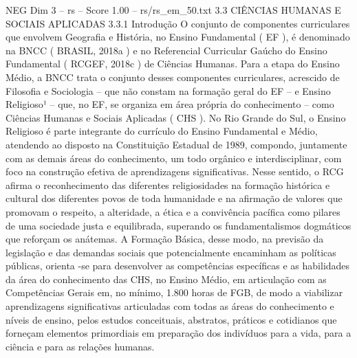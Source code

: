 \begin{textsample}{NEG Dim 3 – rs – Score 1.00 – rs/rs\_em\_50.txt}  \label{ex:f3_neg_049}
3.3 CIÊNCIAS HUMANAS E SOCIAIS APLICADAS 3.3.1 Introdução O conjunto de componentes curriculares que envolvem Geografia e História, no Ensino Fundamental ( EF ), é denominado na BNCC ( BRASIL, 2018a ) e no Referencial Curricular Gaúcho do Ensino Fundamental ( RCGEF, 2018c ) de Ciências Humanas.
Para a etapa do Ensino Médio, a BNCC trata o conjunto desses componentes curriculares, acrescido de Filosofia e Sociologia – que não constam na formação geral do EF – e Ensino Religioso¹ – que, no EF, se organiza em área própria do conhecimento – como Ciências Humanas e Sociais Aplicadas ( CHS ).
No Rio Grande do Sul, o Ensino Religioso é parte integrante do currículo do Ensino Fundamental e Médio, atendendo ao disposto na Constituição Estadual de 1989, compondo, juntamente com as demais áreas do conhecimento, um todo orgânico e interdisciplinar, com foco na construção efetiva de aprendizagens significativas.
Nesse sentido, o RCG afirma o reconhecimento das diferentes religiosidades na formação histórica e cultural dos diferentes povos de toda humanidade e na afirmação de valores que promovam o respeito, a alteridade, a ética e a convivência pacífica como pilares de uma sociedade justa e equilibrada, superando os fundamentalismos dogmáticos que reforçam os anátemas.
A Formação Básica, desse modo, na previsão da legislação e das demandas sociais que potencialmente encaminham as políticas públicas, orienta -se para desenvolver as competências específicas e as habilidades da área do conhecimento das CHS, no Ensino Médio, em articulação com as Competências Gerais em, no mínimo, 1.800 horas de FGB, de modo a viabilizar aprendizagens significativas articuladas com todas as áreas do conhecimento e níveis de ensino, pelos estudos conceituais, abstratos, práticos e cotidianos que forneçam elementos primordiais em preparação dos indivíduos para a vida, para a ciência e para as relações humanas.

\end{textsample}
